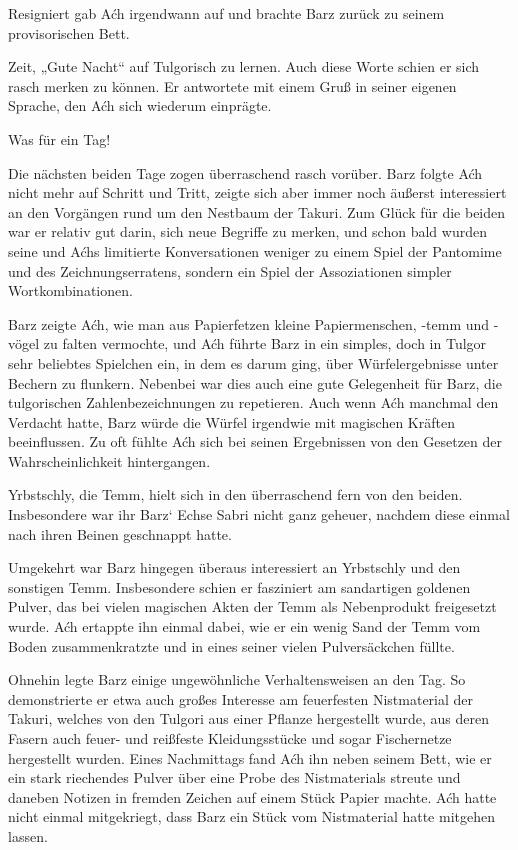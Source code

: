 Resigniert gab Aćh irgendwann auf und brachte Barz zurück zu seinem provisorischen Bett.

Zeit, „Gute Nacht“ auf Tulgorisch zu lernen. Auch diese Worte schien er sich rasch merken zu können. Er antwortete mit einem Gruß in seiner eigenen Sprache, den Aćh sich wiederum einprägte.

Was für ein Tag!



\trennzeichen



Die nächsten beiden Tage zogen überraschend rasch vorüber. Barz folgte Aćh nicht mehr auf Schritt und Tritt, zeigte sich aber immer noch äußerst interessiert an den Vorgängen rund um den Nestbaum der Takuri. Zum Glück für die beiden war er relativ gut darin, sich neue Begriffe zu merken, und schon bald wurden seine und Aćhs limitierte Konversationen weniger zu einem Spiel der Pantomime und des Zeichnungserratens, sondern ein Spiel der Assoziationen simpler Wortkombinationen.

Barz zeigte Aćh, wie man aus Papierfetzen kleine Papiermenschen, -temm und -vögel zu falten vermochte, und Aćh führte Barz in ein simples, doch in Tulgor sehr beliebtes Spielchen ein, in dem es darum ging, über Würfelergebnisse unter Bechern zu flunkern. Nebenbei war dies auch eine gute Gelegenheit für Barz, die tulgorischen Zahlenbezeichnungen zu repetieren. Auch wenn Aćh manchmal den Verdacht hatte, Barz würde die Würfel irgendwie mit magischen Kräften beeinflussen. Zu oft fühlte Aćh sich bei seinen Ergebnissen von den Gesetzen der Wahrscheinlichkeit hintergangen.

Yrbstschly, die Temm, hielt sich in den überraschend fern von den beiden. Insbesondere war ihr Barz‘ Echse Sabri nicht ganz geheuer, nachdem diese einmal nach ihren Beinen geschnappt hatte.

Umgekehrt war Barz hingegen überaus interessiert an Yrbstschly und den sonstigen Temm. Insbesondere schien er fasziniert am sandartigen goldenen Pulver, das bei vielen magischen Akten der Temm als Nebenprodukt freigesetzt wurde. Aćh ertappte ihn einmal dabei, wie er ein wenig Sand der Temm vom Boden zusammenkratzte und in eines seiner vielen Pulversäckchen füllte.

Ohnehin legte Barz einige ungewöhnliche Verhaltensweisen an den Tag. So demonstrierte er etwa auch großes Interesse am feuerfesten Nistmaterial der Takuri, welches von den Tulgori aus einer Pflanze hergestellt wurde, aus deren Fasern auch feuer- und reißfeste Kleidungsstücke und sogar Fischernetze hergestellt wurden. Eines Nachmittags fand Aćh ihn neben seinem Bett, wie er ein stark riechendes Pulver über eine Probe des Nistmaterials streute und daneben Notizen in fremden Zeichen auf einem Stück Papier machte. Aćh hatte nicht einmal mitgekriegt, dass Barz ein Stück vom Nistmaterial hatte mitgehen lassen.

